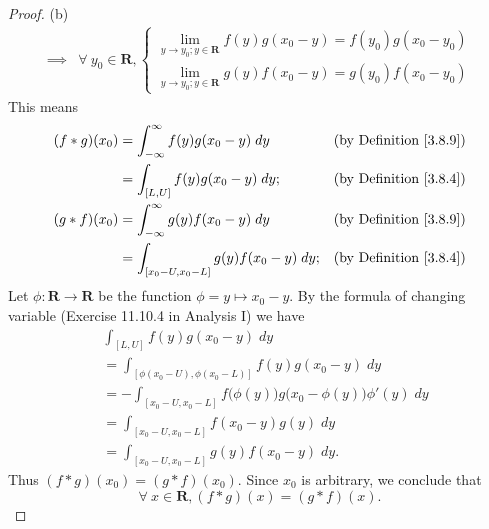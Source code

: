 \begin{proof}{(b)}
\begin{align*}
        \implies & \forall\ y_0 \in \mathbf{R}, \begin{cases}
            \lim_{y \to y_0 ; y \in \mathbf{R}} f(y) g(x_0 - y) = f(y_0) g(x_0 - y_0) \\
            \lim_{y \to y_0 ; y \in \mathbf{R}} g(y) f(x_0 - y) = g(y_0) f(x_0 - y_0)
        \end{cases}
    \end{align*}
    This means
    \begin{align*}
        (f * g)(x_0) & = \int_{-\infty}^\infty f(y) g(x_0 - y) \; dy      & \text{(by Definition \ref{3.8.9})} \\
                     & = \int_{[L, U]} f(y) g(x_0 - y) \; dy;             & \text{(by Definition \ref{3.8.4})} \\
        (g * f)(x_0) & = \int_{-\infty}^\infty g(y) f(x_0 - y) \; dy      & \text{(by Definition \ref{3.8.9})} \\
                     & = \int_{[x_0 - U, x_0 - L]} g(y) f(x_0 - y) \; dy; & \text{(by Definition \ref{3.8.4})}
    \end{align*}
    Let \(\phi : \mathbf{R} \to \mathbf{R}\) be the function \(\phi = y \mapsto x_0 - y\).
    By the formula of changing variable (Exercise 11.10.4 in Analysis I) we have
    \begin{align*}
         & \int_{[L, U]} f(y) g(x_0 - y) \; dy                                                     \\
         & = \int_{[\phi(x_0 - U), \phi(x_0 - L)]} f(y) g(x_0 - y) \; dy                           \\
         & = -\int_{[x_0 - U, x_0 - L]} f\big(\phi(y)\big) g\big(x_0 - \phi(y)\big) \phi'(y) \; dy \\
         & = \int_{[x_0 - U, x_0 - L]} f(x_0 - y) g(y) \; dy                                       \\
         & = \int_{[x_0 - U, x_0 - L]} g(y) f(x_0 - y) \; dy.
    \end{align*}
    Thus \((f * g)(x_0) = (g * f)(x_0)\).
    Since \(x_0\) is arbitrary, we conclude that
    \[
        \forall\ x \in \mathbf{R}, (f * g)(x) = (g * f)(x).
    \]
\end{proof}

